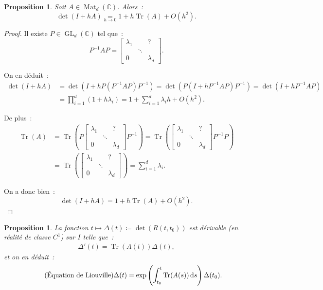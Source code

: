 \documentclass{report}
\newtheorem{prp}[thm]{Proposition}
\theoremstyle{definition}
\theoremstyle{remark}
\numberwithin{equation}{section}
\newcommand{\C}{\mathbb C}
\DeclareMathOperator{\Mat}{Mat}
\DeclareMathOperator{\Tr}{Tr}
\DeclareMathOperator{\GL}{GL}
\begin{document}
		\begin{prp} Soit $A \in \Mat_d(\C)$. Alors~:
		\begin{equation}
			\det(I + hA) \underset{h \to 0}= 1 + h\Tr(A) + O(h^2).
		\end{equation}
		\end{prp}

		\begin{proof} Il existe $P \in \GL_d(\C)$ tel que~:
		\begin{equation}
			P^{-1}AP = \begin{bmatrix}\lambda_1 & & ? \\& \ddots & \\0 & & \lambda_d\end{bmatrix}.
		\end{equation}

		On en déduit~:
		\begin{align}
			\det(I + hA) &= \det(I + hP(P^{-1}AP)P^{-1}) = \det\left(P(I + hP^{-1}AP)P^{-1}\right) = \det(I + hP^{-1}AP) \\
			&=\prod_{i=1}^d\left(1 + h\lambda_i\right) = 1 + \sum_{i=1}^d\lambda_ih  + O(h^2).
		\end{align}

		De plus~:
		\begin{align}
			\Tr(A) &= \Tr\left(P\begin{bmatrix}\lambda_1 & & ?\\& \ddots & \\0 & & \lambda_d\end{bmatrix}P^{-1}\right) =
				\Tr\left(\begin{bmatrix}\lambda_1 & & ? \\& \ddots & \\0 & & \lambda_d\end{bmatrix}P^{-1}P\right) \\
			&= \Tr\left(\begin{bmatrix}\lambda_1 & & ? \\ & \ddots & \\0 & & \lambda_d\end{bmatrix}\right) = \sum_{i=1}^d\lambda_i.
		\end{align}

		On a donc bien~:
		\begin{equation}
			\det(I + hA) = 1 + h\Tr(A) + O(h^2).
		\end{equation}
		\end{proof}

		\begin{prp} La fonction $t \mapsto \Delta(t) \coloneqq \det(R(t, t_0))$ est dérivable (en réalité de classe $C^1$) sur $I$ telle que~:
		\begin{align}\tag{Équation de Jacobi}
			\Delta'(t) = \Tr(A(t))\Delta(t),
		\end{align}
		et on en déduit~:
		\begin{align}\tag{Équation de Liouville}
			\Delta(t) = \exp\left(\int_{t_0}^t\Tr(A(s))\dif s\right)\Delta(t_0).
		\end{align}
		\end{prp}
\end{document}
